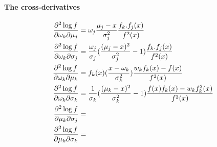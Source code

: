 \documentclass[]{article}
\begin{document}
\paragraph{The cross-derivatives}

\begin{align*}
	\pdv{\log f}{\omega_k}{\mu_j} (x) &= \omega_j \frac{\mu_j - x}{\sigma_j^2}\frac{f_k.f_j(x)}{f^2(x)} \\	
	\pdv{\log f}{\omega_k}{\sigma_j} (x) &= \frac{\omega_j}{\sigma_j} ( \frac{(\mu_j -x)^2}{\sigma_j^2} - 1)  \frac{f_k.f_j(x)}{f^2(x)} \\	
	\pdv{\log f}{\omega_k}{\mu_k} (x) &= f_k(x) (\frac{x - \omega_k}{\sigma_k^2}) \frac{w_k f_k(x) - f(x)}{f^2(x)}\\
	\pdv{\log f}{\omega_k}{\sigma_k} (x) &= \frac{1}{\sigma_k} ( \frac{(\mu_k -x)^2}{\sigma_k^2} - 1) \frac{f(x) f_k(x) - w_k f_k^2(x)}{f^2(x)}  \\
	\pdv{\log f}{\mu_k}{\sigma_j} (x) &= \\
	\pdv{\log f}{\mu_k}{\sigma_k} (x) &=
\end{align*}
\end{document}
